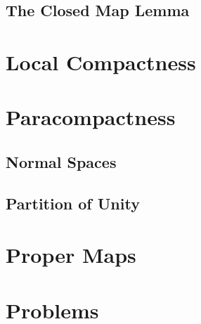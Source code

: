 \subsection*{The Closed Map Lemma}

\section*{Local Compactness}

\section*{Paracompactness}

\subsection*{Normal Spaces}

\subsection*{Partition of Unity}

\section*{Proper Maps}

\section*{Problems}
